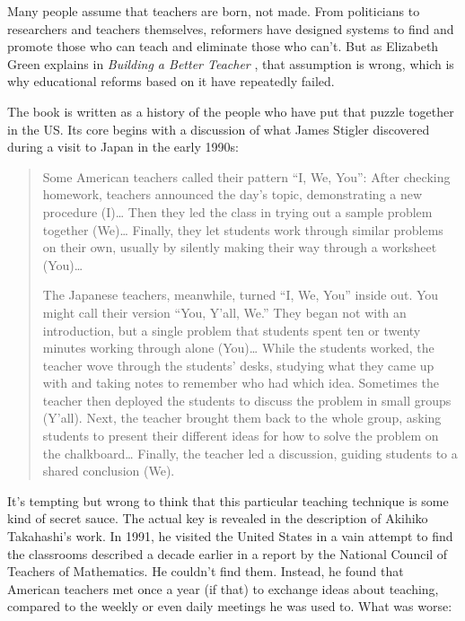 
Many people assume that teachers are born, not made. From politicians
to researchers and teachers themselves, reformers have designed
systems to find and promote those who can teach and eliminate those
who can't. But as Elizabeth Green explains in
\emph{Building a Better Teacher} \cite{bib:green-babt}, that
assumption is wrong, which is why educational reforms based on it
have repeatedly failed.

The book is written as a history of the people who have put that puzzle
together in the US. Its core begins with a discussion of what James
Stigler discovered during a visit to Japan in the early 1990s:

\begin{quote}

  Some American teachers called their pattern ``I, We, You'': After
  checking homework, teachers announced the day's topic, demonstrating
  a new procedure (I){\ldots} Then they led the class in trying out a
  sample problem together (We){\ldots} Finally, they let students work
  through similar problems on their own, usually by silently making
  their way through a worksheet (You){\ldots}

  The Japanese teachers, meanwhile, turned ``I, We, You'' inside
  out. You might call their version ``You, Y'all, We.'' They began not
  with an introduction, but a single problem that students spent ten
  or twenty minutes working through alone (You){\ldots} While the
  students worked, the teacher wove through the students' desks,
  studying what they came up with and taking notes to remember who had
  which idea. Sometimes the teacher then deployed the students to
  discuss the problem in small groups (Y'all). Next, the teacher
  brought them back to the whole group, asking students to present
  their different ideas for how to solve the problem on the
  chalkboard{\ldots} Finally, the teacher led a discussion, guiding
  students to a shared conclusion (We).

\end{quote}

It's tempting but wrong to think that this particular teaching
technique is some kind of secret sauce. The actual key is revealed in
the description of Akihiko Takahashi's work. In 1991, he visited the
United States in a vain attempt to find the classrooms described a
decade earlier in a report by the National Council of Teachers of
Mathematics. He couldn't find them. Instead, he found that American
teachers met once a year (if that) to exchange ideas about teaching,
compared to the weekly or even daily meetings he was used to. What was
worse:

